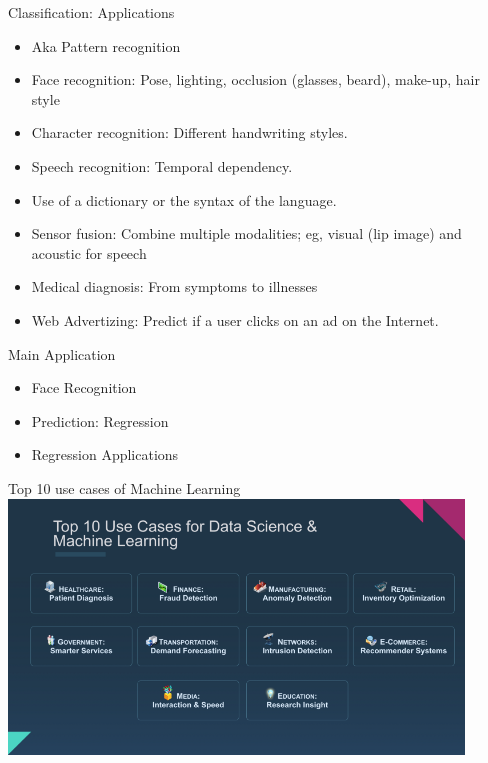 \documentclass{beamer}
\begin{document}
\begin{frame}{Classification: Applications}
    \begin{itemize}
        \item Aka Pattern recognition
\item Face recognition: Pose, lighting, occlusion (glasses, beard), make-up, hair style 
\item Character recognition: Different handwriting styles.
\item Speech recognition: Temporal dependency. 
\item Use of a dictionary or the syntax of the language. 
\item Sensor fusion: Combine multiple modalities; eg, visual (lip image) and acoustic for speech
\item Medical diagnosis: From symptoms to illnesses
\item Web Advertizing: Predict if a user clicks on an ad on the Internet.
\end{itemize}
\end{frame}

\begin{frame}{Main Application}
    \begin{itemize}
        \item Face Recognition
        \item Prediction: Regression
        \item Regression Applications
    \end{itemize}
\end{frame}

\begin{frame}{Top 10 use cases of Machine Learning}
\includegraphics[height=6.8cm]{1_kTnSJQpzGw_w4uQKa_j7VQ.png}
\centering
\end{frame}
\end{document}
